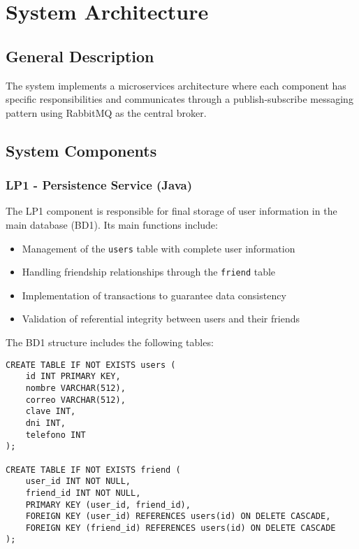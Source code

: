 \documentclass[10pt,a4paper]{article}
\theoremstyle{definition}
\theoremstyle{remark}
\begin{document}
\section{System Architecture}

\subsection{General Description}
The system implements a microservices architecture where each component has specific responsibilities and communicates through a publish-subscribe messaging pattern using RabbitMQ as the central broker.

\subsection{System Components}

\subsubsection{LP1 - Persistence Service (Java)}
The LP1 component is responsible for final storage of user information in the main database (BD1). Its main functions include:

\begin{itemize}
    \item Management of the \texttt{users} table with complete user information
    \item Handling friendship relationships through the \texttt{friend} table
    \item Implementation of transactions to guarantee data consistency
    \item Validation of referential integrity between users and their friends
\end{itemize}

The BD1 structure includes the following tables:

\begin{lstlisting}[style=sqlstyle, caption={BD1 Structure - Main Database}]
CREATE TABLE IF NOT EXISTS users (
    id INT PRIMARY KEY,
    nombre VARCHAR(512),
    correo VARCHAR(512),
    clave INT,
    dni INT,
    telefono INT
);

CREATE TABLE IF NOT EXISTS friend (
    user_id INT NOT NULL,
    friend_id INT NOT NULL,
    PRIMARY KEY (user_id, friend_id),
    FOREIGN KEY (user_id) REFERENCES users(id) ON DELETE CASCADE,
    FOREIGN KEY (friend_id) REFERENCES users(id) ON DELETE CASCADE
);
\end{lstlisting}
\end{document}
